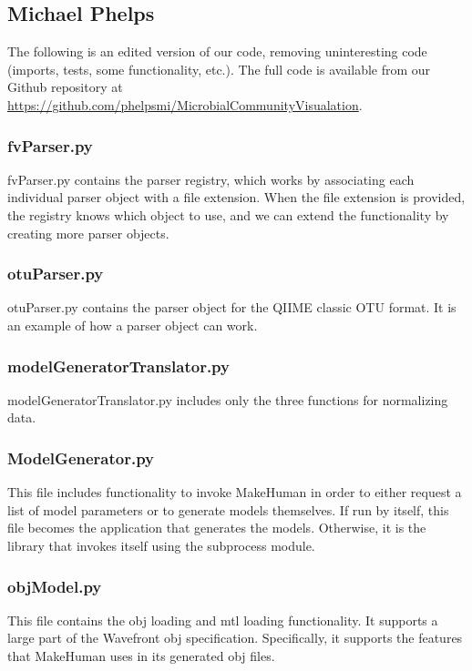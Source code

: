 \documentclass[letterpaper,10pt, onecolumn, draftclsnofoot]{IEEEtran}
\begin{document}
\subsection{Michael Phelps}

The following is an edited version of our code, removing uninteresting code (imports, tests, some functionality, etc.). The full code is available from our Github repository at \url{https://github.com/phelpsmi/MicrobialCommunityVisualation}.

\subsubsection{fvParser.py}
fvParser.py contains the parser registry, which works by associating each individual parser object with a file extension. When the file extension is provided, the registry knows which object to use, and we can extend the functionality by creating more parser objects.



\subsubsection{otuParser.py}
otuParser.py contains the parser object for the QIIME classic OTU format. It is an example of how a parser object can work.



\subsubsection{modelGeneratorTranslator.py}
modelGeneratorTranslator.py includes only the three functions for normalizing data. 



\subsubsection{ModelGenerator.py}
This file includes functionality to invoke MakeHuman in order to either request a list of model parameters or to generate models themselves. If run by itself, this file becomes the application that generates the models. Otherwise, it is the library that invokes itself using the subprocess module. 



\subsubsection{objModel.py}
This file contains the obj loading and mtl loading functionality. It supports a large part of the Wavefront obj specification. Specifically, it supports the features that MakeHuman uses in its generated obj files.




\end{document}
